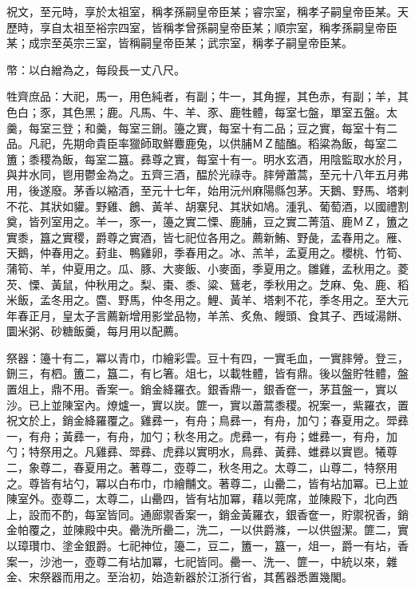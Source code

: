 \begin{pinyinscope}
 祝文，至元時，享於太祖室，稱孝孫嗣皇帝臣某；睿宗室，稱孝子嗣皇帝臣某。天歷時，享自太祖至裕宗四室，皆稱孝曾孫嗣皇帝臣某；順宗室，稱孝孫嗣皇帝臣某；成宗至英宗三室，皆稱嗣皇帝臣某；武宗室，稱孝子嗣皇帝臣某。



 幣：以白繒為之，每段長一丈八尺。



 牲齊庶品：大祀，馬一，用色純者，有副；牛一，其角握，其色赤，有副；羊，其色白；豕，其色黑；鹿。凡馬、牛、羊、豕、鹿牲體，每室七盤，單室五盤。太羹，每室三登；和羹，每室三鉶。籩之實，每室十有二品；豆之實，每室十有二品。凡祀，先期命貴臣率獵師取鮮麞鹿兔，以供脯ＭＺ醓醢。稻粱為飯，每室二簠；黍稷為飯，每室二簋。彞尊之實，每室十有一。明水玄酒，用陰監取水於月，與井水同，鬯用鬱金為之。五齊三酒，醖於光祿寺。膟膋蕭蒿，至元十八年五月弗用，後遂廢。茅香以縮酒，至元十七年，始用沅州麻陽縣包茅。天鵝、野馬、塔剌不花、其狀如貛。野雞、鶬、黃羊、胡寨兒、其狀如鳩。湩乳、葡萄酒，以國禮割奠，皆列室用之。羊一，豕一，籩之實二慄、鹿脯，豆之實二菁菹、鹿ＭＺ，簠之實黍，簋之實稷，爵尊之實酒，皆七祀位各用之。薦新鮪、野彘，孟春用之。雁、天鵝，仲春用之。葑韭、鴨雞卵，季春用之。冰、羔羊，孟夏用之。櫻桃、竹筍、蒲筍、羊，仲夏用之。瓜、豚、大麥飯、小麥面，季夏用之。雛雞，孟秋用之。菱芡、慄、黃鼠，仲秋用之。梨、棗、黍、粱、鶿老，季秋用之。芝麻、兔、鹿、稻米飯，孟冬用之。麕、野馬，仲冬用之。鯉、黃羊、塔剌不花，季冬用之。至大元年春正月，皇太子言薦新增用影堂品物，羊羔、炙魚、饅頭、食其子、西域湯餅、圜米粥、砂糖飯羹，每月用以配薦。



 祭器：籩十有二，冪以青巾，巾繪彩雲。豆十有四，一實毛血，一實膟膋。登三，鉶三，有柶。簠二，簋二，有匕箸。俎七，以載牲體，皆有鼎。後以盤貯牲體，盤置俎上，鼎不用。香案一。銷金絳羅衣。銀香鼎一，銀香奩一，茅苴盤一，實以沙。已上並陳室內。燎爐一，實以炭。篚一，實以蕭蒿黍稷。祝案一，紫羅衣，置祝文於上，銷金絳羅覆之。雞彞一，有舟；鳥彞一，有舟，加勺；春夏用之。斝彞一，有舟；黃彞一，有舟，加勺；秋冬用之。虎彞一，有舟；蜼彞一，有舟，加勺；特祭用之。凡雞彞、斝彞、虎彞以實明水，鳥彞、黃彞、蜼彞以實鬯。犧尊二，象尊二，春夏用之。著尊二，壺尊二，秋冬用之。太尊二，山尊二，特祭用之。尊皆有坫勺，冪以白布巾，巾繪黼文。著尊二，山罍二，皆有坫加冪。已上並陳室外。壺尊二，太尊二，山罍四，皆有坫加冪，藉以莞席，並陳殿下，北向西上，設而不酌，每室皆同。通廊禦香案一，銷金黃羅衣，銀香奩一，貯禦祝香，銷金帕覆之，並陳殿中央。罍洗所罍二，洗二，一以供爵滌，一以供盥潔。篚二，實以璋瓚巾、塗金銀爵。七祀神位，籩二，豆二，簠一，簋一，俎一，爵一有坫，香案一，沙池一，壺尊二有坫加冪，七祀皆同。罍一、洗一、篚一，中統以來，雜金、宋祭器而用之。至治初，始造新器於江浙行省，其舊器悉置幾閣。




\end{pinyinscope}
